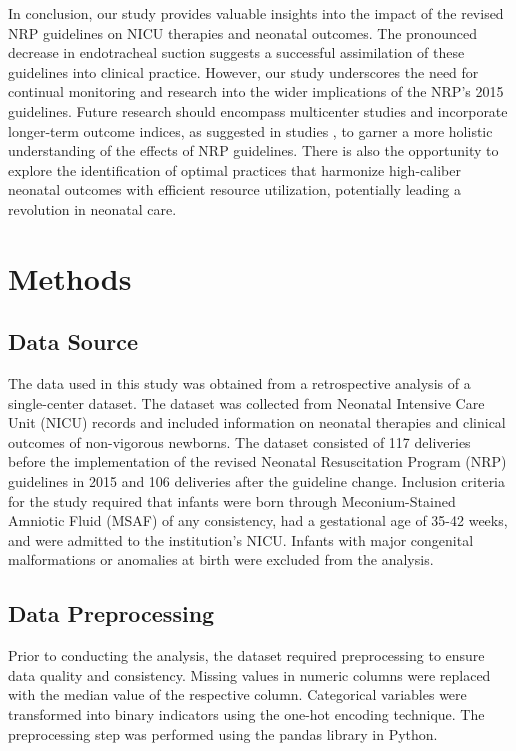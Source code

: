 \documentclass[11pt]{article}
\begin{document}
In conclusion, our study provides valuable insights into the impact of the revised NRP guidelines on NICU therapies and neonatal outcomes. The pronounced decrease in endotracheal suction suggests a successful assimilation of these guidelines into clinical practice. However, our study underscores the need for continual monitoring and research into the wider implications of the NRP's 2015 guidelines. Future research should encompass multicenter studies and incorporate longer-term outcome indices, as suggested in studies \cite{Lund2001NeonatalSC, Ghetti2019LongitudinalSO}, to garner a more holistic understanding of the effects of NRP guidelines. There is also the opportunity to explore the identification of optimal practices that harmonize high-caliber neonatal outcomes with efficient resource utilization, potentially leading a revolution in neonatal care.

\section*{Methods}

\subsection*{Data Source}
The data used in this study was obtained from a retrospective analysis of a single-center dataset. The dataset was collected from Neonatal Intensive Care Unit (NICU) records and included information on neonatal therapies and clinical outcomes of non-vigorous newborns. The dataset consisted of 117 deliveries before the implementation of the revised Neonatal Resuscitation Program (NRP) guidelines in 2015 and 106 deliveries after the guideline change. Inclusion criteria for the study required that infants were born through Meconium-Stained Amniotic Fluid (MSAF) of any consistency, had a gestational age of 35-42 weeks, and were admitted to the institution's NICU. Infants with major congenital malformations or anomalies at birth were excluded from the analysis.

\subsection*{Data Preprocessing}
Prior to conducting the analysis, the dataset required preprocessing to ensure data quality and consistency. Missing values in numeric columns were replaced with the median value of the respective column. Categorical variables were transformed into binary indicators using the one-hot encoding technique. The preprocessing step was performed using the pandas library in Python.
\end{document}
